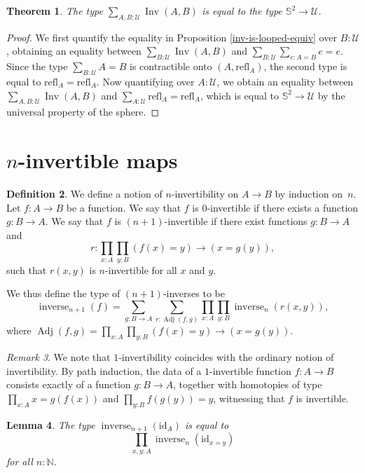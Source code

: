 \documentclass{article}
\theoremstyle{plain}
\newtheorem{theorem}{Theorem}
\newtheorem{lemma}[theorem]{Lemma}
\theoremstyle{definition}
\newtheorem{definition}[theorem]{Definition}
\theoremstyle{remark}
\newtheorem{remark}[theorem]{Remark}
\newcommand{\id}{\mathrm{id}}
\newcommand{\refl}{\mathrm{refl}}
\newcommand{\nsphere}[1]{\mathbb{S}^{#1}}
\newcommand{\sphere}{\nsphere{2}}
\newcommand{\U}{\mathcal{U}}
\newcommand{\N}{\mathbb{N}}
\DeclareMathOperator{\inv}{Inv}
\DeclareMathOperator{\inverse}{inverse}
\DeclareMathOperator{\adj}{Adj}
\newcommand{\ninverse}[1]{\inverse_{#1}}
\begin{document}
\begin{theorem}
  The type \(\sum_{A, B : \U}\inv(A, B)\) is equal to the type \(\sphere \to \U\).
\end{theorem}

\begin{proof}
  We first quantify the equality in Proposition
  \ref{inv-is-looped-equiv} over \(B : \U\), obtaining an equality between
  \(\sum_{B : \U}\inv(A, B)\) and \(\sum_{B : \U}\sum_{e : A = B}e = e\).
  Since the type \(\sum_{B : \U}A = B\) is contractible onto
  \(\left(A, \refl_{A}\right)\), the second type is equal to
  \(\refl_{A} = \refl_{A}\). Now quantifying
  over \(A : \U\), we obtain an equality between \(\sum_{A, B : \U}\inv(A, B)\) and
  \(\sum_{A : \U}\refl_{A} = \refl_{A}\), which is equal to \(\sphere \to \U\) by the
  universal property of the sphere.
\end{proof}

\section{\(n\)-invertible maps}

\begin{definition}
  We define a notion of \(n\)-invertibility on \(A \to B\) by induction on~\(n\).
  Let \(f : A \to B\) be a function. We say that \(f\) is
  \(0\)-invertible if there exists a function \(g : B \to A\).
  We say that \(f\) is \((n + 1)\)-invertible if there exist functions \(g : B \to A\) and
  \[r : \prod_{x : A}\prod_{y : B}(f(x) = y) \to (x = g(y)),\]
  such that \(r(x, y)\) is \(n\)-invertible for all \(x\) and \(y\).

  We thus define the type of \((n + 1)\)-inverses to be
  \[\ninverse{n + 1}(f) =
    \sum_{g : B \to A}\sum_{r : \adj(f, g)}
    \prod_{x : A}\prod_{y : B}\ninverse{n}(r(x, y)),\]
  where \(\adj(f, g) = \prod_{x : A}\prod_{y : B}(f(x) = y) \to (x = g(y))\).
\end{definition}

\begin{remark}
  We note that \(1\)-invertibility coincides with the ordinary notion of invertibility.
  By path induction, the data of a \(1\)-invertible function \(f : A \to B\)
  consists exactly of a function \(g : B \to A\), together with homotopies of type
  \(\prod_{x : A} x = g(f(x))\) and \(\prod_{y : B} f(g(y)) = y\), witnessing
  that \(f\) is invertible.
\end{remark}

\begin{lemma}
  The type \(\ninverse{n + 1}(\id_{A})\) is equal to
  \[\prod_{x, y : A}\ninverse{n}(\id_{x = y})\]
  for all \(n : \N\).
\end{lemma}
\end{document}
